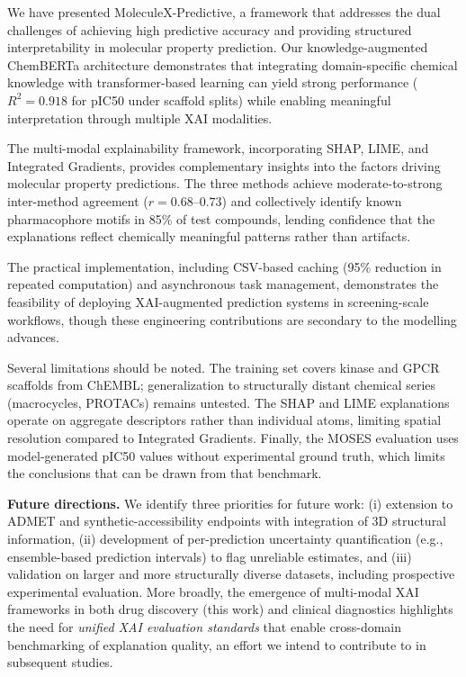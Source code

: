 \documentclass[preprint,12pt]{elsarticle}
\begin{document}
We have presented MoleculeX-Predictive, a framework that addresses the dual challenges of achieving high predictive accuracy and providing structured interpretability in molecular property prediction. Our knowledge-augmented ChemBERTa architecture demonstrates that integrating domain-specific chemical knowledge with transformer-based learning can yield strong performance ($R^2 = 0.918$ for pIC50 under scaffold splits) while enabling meaningful interpretation through multiple XAI modalities.

The multi-modal explainability framework, incorporating SHAP, LIME, and Integrated Gradients, provides complementary insights into the factors driving molecular property predictions. The three methods achieve moderate-to-strong inter-method agreement ($r = 0.68$--$0.73$) and collectively identify known pharmacophore motifs in 85\% of test compounds, lending confidence that the explanations reflect chemically meaningful patterns rather than artifacts.

The practical implementation, including CSV-based caching (95\% reduction in repeated computation) and asynchronous task management, demonstrates the feasibility of deploying XAI-augmented prediction systems in screening-scale workflows, though these engineering contributions are secondary to the modelling advances.

Several limitations should be noted. The training set covers kinase and GPCR scaffolds from ChEMBL; generalization to structurally distant chemical series (macrocycles, PROTACs) remains untested. The SHAP and LIME explanations operate on aggregate descriptors rather than individual atoms, limiting spatial resolution compared to Integrated Gradients. Finally, the MOSES evaluation uses model-generated pIC50 values without experimental ground truth, which limits the conclusions that can be drawn from that benchmark.

\textbf{Future directions.}
We identify three priorities for future work: (i) extension to ADMET and synthetic-accessibility endpoints with integration of 3D structural information, (ii) development of per-prediction uncertainty quantification (e.g., ensemble-based prediction intervals) to flag unreliable estimates, and (iii) validation on larger and more structurally diverse datasets, including prospective experimental evaluation. More broadly, the emergence of multi-modal XAI frameworks in both drug discovery (this work) and clinical diagnostics \cite{chowdhury2025ensemble,hussain2025neuroblend} highlights the need for \emph{unified XAI evaluation standards} that enable cross-domain benchmarking of explanation quality, an effort we intend to contribute to in subsequent studies.
\end{document}
